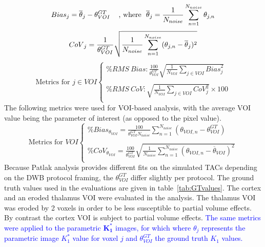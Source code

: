 \begin{equation}
\label{eq:BiasImage}
{Bias}_{j}  = \overline{\theta}_{j} - \theta_{VOI}^{GT} \  \hspace{3mm} 
\text{, where } \ 
\overline{\theta}_{j}  = \frac{1}{N_{noise}} \sum_{n=1}^{N_{noise}} {\theta_{j,n}} \\ 
\end{equation}
%
%
\begin{equation}
\label{eq:CoVImage}
{CoV}_{j}  = \frac{1}{{\theta_{VOI}^{GT}}} \sqrt{\frac{1}{N_{noise}}\sum_{n=1}^{N_{noise}} (\theta_{j,n} - \overline{\theta}_{j} )^2}  \\
\end{equation}
%
\!
%
%
\begin{equation}
\label{eq:VoxMetrics}
\text{Metrics for } {j\in VOI}
\begin{cases}  
\% RMS\ {Bias} : \frac{100}{{\theta_{VOI}^{GT}}} \sqrt{\frac{1}{N_{VOI}} \sum_{j\in VOI} {Bias}_{j}^{2}} \\ \\  
\% RMS\ {CoV}  : \sqrt{\frac{1}{N_{VOI}} \sum_{j\in VOI} {CoV}_{j}^{2}}  \times100\\
\end{cases}
\end{equation}
The following metrics were used for VOI-based analysis, with the average VOI value being the parameter of interest (as opposed to the pixel value).
\begin{equation}
\text{Metrics for } {VOI}
\begin{cases}
\% {Bias}_{{\theta}_{VOI}} = \frac{100}{\theta_{VOI}^{GT} N_{noise} } \sum_{n=1}^{N_{noise}} ({\theta_{VOI,n} - \theta_{VOI}^{GT}}) \\ \\
\% CoV_{{\theta}_{VOI}} = \frac{100}{{\theta_{VOI}^{GT}}} \sqrt{ \frac{1}{N_{noise}} \sum_{n=1}^{N_{noise}} (\theta_{VOI,n} - \overline{\theta}_{VOI} )^2 }   \\ 
\end{cases}
\end{equation}
%
Because Patlak analysis provides different fits on the simulated TACs depending on the DWB protocol framing, the $\theta_{VOI}^{GT}$ differ slightly per protocol. The ground truth values used in the evaluations are given in table~\ref{tab:GTvalues}. 
The cortex and an eroded thalamus VOI were evaluated in the analysis.
The thalamus VOI was eroded by 2 voxels 
in order to be less susceptible to partial volume effects. By contrast the cortex VOI is subject to partial volume effects.
%
\textcolor{blue}{The same metrics were applied to the parametric $\boldsymbol{K_1^*}$ images, for which where $\theta_{j}$ represents the parametric image $K_1^*$ value for voxel $j$ and $\theta_{VOI}^{GT}$ the ground truth $K_1$ values.}

